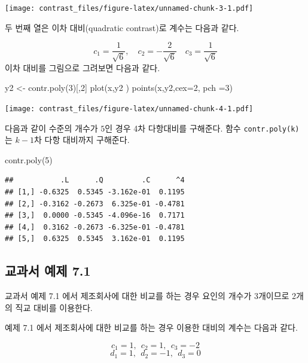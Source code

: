 \documentclass[
]{book}
\newenvironment{Shaded}{\begin{snugshade}}{\end{snugshade}}
\newcommand{\AttributeTok}[1]{\textcolor[rgb]{0.77,0.63,0.00}{#1}}
\newcommand{\DecValTok}[1]{\textcolor[rgb]{0.00,0.00,0.81}{#1}}
\newcommand{\FunctionTok}[1]{\textcolor[rgb]{0.00,0.00,0.00}{#1}}
\newcommand{\NormalTok}[1]{#1}
\newcommand{\OtherTok}[1]{\textcolor[rgb]{0.56,0.35,0.01}{#1}}
\begin{document}
\texttt{[image: contrast\_files/figure-latex/unnamed-chunk-3-1.pdf]}

두 번째 열은 이차 대비(quadratic contrast)로 계수는 다음과 같다.

\[ c_1=  \frac{1}{\sqrt{6}}, \quad c_2 = - \frac{2}{\sqrt{6}} \quad c_3=  \frac{1}{\sqrt{6}} \]
이차 대비를 그림으로 그려보면 다음과 같다.

\begin{Shaded}
\begin{Highlighting}[]
\NormalTok{y2 }\OtherTok{\textless{}{-}} \FunctionTok{contr.poly}\NormalTok{(}\DecValTok{3}\NormalTok{)[,}\DecValTok{2}\NormalTok{]}
\FunctionTok{plot}\NormalTok{(x,y2 )}
\FunctionTok{points}\NormalTok{(x,y2,}\AttributeTok{cex=}\DecValTok{2}\NormalTok{, }\AttributeTok{pch =}\DecValTok{3}\NormalTok{)}
\end{Highlighting}
\end{Shaded}

\texttt{[image: contrast\_files/figure-latex/unnamed-chunk-4-1.pdf]}

다음과 같이 수준의 개수가 \(5\)인 경우 4차 다항대비를 구해준다. 함수 \texttt{contr.poly(k)}는 \(k-1\)차 다항 대비까지 구해준다.

\begin{Shaded}
\begin{Highlighting}[]
\FunctionTok{contr.poly}\NormalTok{(}\DecValTok{5}\NormalTok{)}
\end{Highlighting}
\end{Shaded}

\begin{verbatim}
##           .L      .Q         .C      ^4
## [1,] -0.6325  0.5345 -3.162e-01  0.1195
## [2,] -0.3162 -0.2673  6.325e-01 -0.4781
## [3,]  0.0000 -0.5345 -4.096e-16  0.7171
## [4,]  0.3162 -0.2673 -6.325e-01 -0.4781
## [5,]  0.6325  0.5345  3.162e-01  0.1195
\end{verbatim}

\hypertarget{uxad50uxacfcuxc11c-uxc608uxc81c-7.1}{%
\subsection{교과서 예제 7.1}\label{uxad50uxacfcuxc11c-uxc608uxc81c-7.1}}

교과서 예제 7.1 에서 제조회사에 대한 비교를 하는 경우 요인의 개수가 3개이므로 2개의 직교 대비를 이용한다.

예제 7.1 에서 제조회사에 대한 비교를 하는 경우 이용한 대비의 계수는 다음과 같다.

\[ c_1= 1, ~~ c_2=1, ~~ c_3 = -2 \]
\[ d_1= 1, ~~d_2=-1, ~~ d_3= 0 \]
\end{document}
